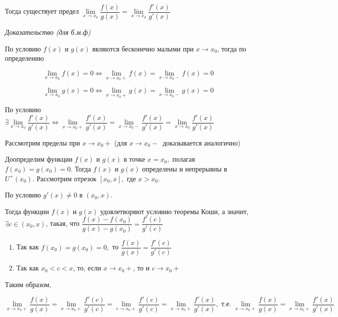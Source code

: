 Тогда существует предел $\lim\limits_{x \rightarrow x_0}{\dfrac{f(x)}{g(x)}} = \lim\limits_{x \rightarrow x_0}{\dfrac{f'(x)}{g'(x)}}$
\vspace*{20pt} 

\textit{Доказательство (для б.м.ф)}

По условию $f(x)$ и $g(x)$ являются бесконечно малыми при $x \rightarrow x_0$, тогда по определению

$$
\lim\limits_{x \rightarrow x_0}f(x) = 0 \iff \lim\limits_{x \rightarrow x_0+}f(x) = \lim\limits_{x \rightarrow x_0-}f(x) = 0
$$

$$
\lim\limits_{x \rightarrow x_0}g(x) = 0 \iff \lim\limits_{x \rightarrow x_0+}g(x) = \lim\limits_{x \rightarrow x_0-}g(x)=0
$$

По условию $\exists \lim\limits_{x \rightarrow x_0}{\dfrac{f'(x)}{g'(x)}} \iff \lim\limits_{x \rightarrow x_0+}{\dfrac{f'(x)}{g'(x)}} = \lim\limits_{x \rightarrow x_0-}{\dfrac{f'(x)}{g'(x)}} = \lim\limits_{x \rightarrow x_0}{\dfrac{f'(x)}{g'(x)}}$

Рассмотрим пределы при $x \rightarrow x_0+$ (для $x \rightarrow x_0- \ $ доказывается аналогично)

Доопределим функции $f(x)$ и $g(x)$ в точке $x = x_0,$ полагая $f(x_0) = g(x_0) = 0$. Тогда $f(x)$ и $g(x)$ определены и непрерывны в $U^+(x_0)$. Рассмотрим отрезок $[x_0, x],$ где $x > x_0$.

По условию $g'(x) \neq 0 $ в $(x_0, x)$.

Тогда функции $f(x)$ и $g(x)$ удовлетворяют условию теоремы Коши, а значит, $\exists c \in (x_0, x)$, такая, что ${\dfrac{f(x) - f(x_0)}{g(x) - g(x_0)}} = {\dfrac{f'(c)}{g'(c)}}$
\begin{enumerate}

\item Так как $f(x_0) = g(x_0) = 0,$ то ${\dfrac{f(x)}{g(x)}} = {\dfrac{f'(c)}{g'(c)}}$
\item Так как $x_0 < c < x$, то, если $x \rightarrow x_0 +$, то и $c \rightarrow x_0+$

\end{enumerate}

Таким образом,

$$
\lim\limits_{x \rightarrow x_0+}{\dfrac{f(x)}{g(x)}} = \lim\limits_{x \rightarrow x_0+}{\dfrac{f'(c)}{g'(c)}} = \lim\limits_{c \rightarrow x_0+}{\dfrac{f'(c)}{g'(c)}} =\lim\limits_{x \rightarrow x_0+}{\dfrac{f'(x)}{g'(x)}}, \text{ т.е. } \lim\limits_{x \rightarrow x_0+}{\dfrac{f(x)}{g(x)}}=\lim\limits_{x \rightarrow x_0+}{\dfrac{f'(x)}{g'(x)}}
$$

